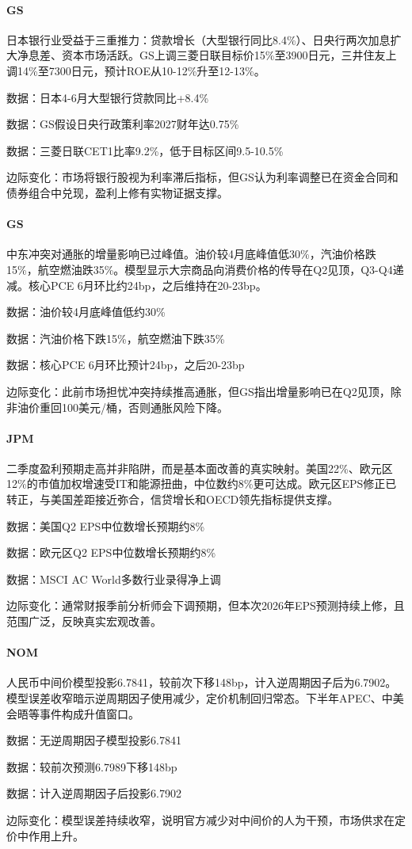 \documentclass[11pt]{ctexart}
\begin{document}
\paragraph{GS} 日本银行业受益于三重推力：贷款增长（大型银行同比8.4\%）、日央行两次加息扩大净息差、资本市场活跃。GS上调三菱日联目标价15\%至3900日元，三井住友上调14\%至7300日元，预计ROE从10-12\%升至12-13\%。
{\small\color{refgray}数据：日本4-6月大型银行贷款同比+8.4\%\par}
{\small\color{refgray}数据：GS假设日央行政策利率2027财年达0.75\%\par}
{\small\color{refgray}数据：三菱日联CET1比率9.2\%，低于目标区间9.5-10.5\%\par}
{\small\color{refgray}边际变化：市场将银行股视为利率滞后指标，但GS认为利率调整已在资金合同和债券组合中兑现，盈利上修有实物证据支撑。\par}
\paragraph{GS} 中东冲突对通胀的增量影响已过峰值。油价较4月底峰值低30\%，汽油价格跌15\%，航空燃油跌35\%。模型显示大宗商品向消费价格的传导在Q2见顶，Q3-Q4递减。核心PCE 6月环比约24bp，之后维持在20-23bp。
{\small\color{refgray}数据：油价较4月底峰值低约30\%\par}
{\small\color{refgray}数据：汽油价格下跌15\%，航空燃油下跌35\%\par}
{\small\color{refgray}数据：核心PCE 6月环比预计24bp，之后20-23bp\par}
{\small\color{refgray}边际变化：此前市场担忧冲突持续推高通胀，但GS指出增量影响已在Q2见顶，除非油价重回100美元/桶，否则通胀风险下降。\par}
\paragraph{JPM} 二季度盈利预期走高并非陷阱，而是基本面改善的真实映射。美国22\%、欧元区12\%的市值加权增速受IT和能源扭曲，中位数约8\%更可达成。欧元区EPS修正已转正，与美国差距接近弥合，信贷增长和OECD领先指标提供支撑。
{\small\color{refgray}数据：美国Q2 EPS中位数增长预期约8\%\par}
{\small\color{refgray}数据：欧元区Q2 EPS中位数增长预期约8\%\par}
{\small\color{refgray}数据：MSCI AC World多数行业录得净上调\par}
{\small\color{refgray}边际变化：通常财报季前分析师会下调预期，但本次2026年EPS预测持续上修，且范围广泛，反映真实宏观改善。\par}
\paragraph{NOM} 人民币中间价模型投影6.7841，较前次下移148bp，计入逆周期因子后为6.7902。模型误差收窄暗示逆周期因子使用减少，定价机制回归常态。下半年APEC、中美会晤等事件构成升值窗口。
{\small\color{refgray}数据：无逆周期因子模型投影6.7841\par}
{\small\color{refgray}数据：较前次预测6.7989下移148bp\par}
{\small\color{refgray}数据：计入逆周期因子后投影6.7902\par}
{\small\color{refgray}边际变化：模型误差持续收窄，说明官方减少对中间价的人为干预，市场供求在定价中作用上升。\par}
\end{document}
